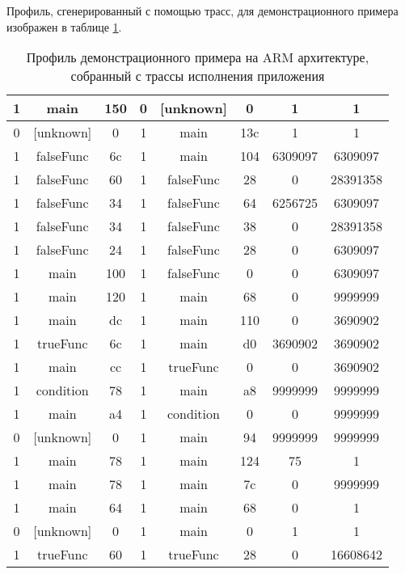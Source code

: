Профиль, сгенерированный с помощью трасс, для демонстрационного примера изображен в таблице \cref{tab:ARMTrace}.
\begin{table} [h]%
    \centering
    \begin{threeparttable}%
        \caption{Профиль демонстрационного примера на ARM архитектуре, собранный с трассы исполнения приложения}%
        \label{tab:ARMTrace}%
        \begin{SingleSpace}
            \begin{tabular}{| c | c | c | c | c | c | c | c |}
                \hline
				1& main& 150& 0& [unknown]& 0& 1& 1 \\ \hline
				0& [unknown]& 0& 1& main& 13c& 1& 1 \\ \hline
				1& falseFunc& 6c& 1& main& 104& 6309097& 6309097 \\ \hline
				1& falseFunc& 60& 1& falseFunc& 28& 0& 28391358 \\ \hline
				1& falseFunc& 34& 1& falseFunc& 64& 6256725& 6309097 \\ \hline
				1& falseFunc& 34& 1& falseFunc& 38& 0& 28391358 \\ \hline
				1& falseFunc& 24& 1& falseFunc& 28& 0& 6309097 \\ \hline
				1& main& 100& 1& falseFunc& 0& 0& 6309097 \\ \hline
				1& main& 120& 1& main& 68& 0& 9999999 \\ \hline
				1& main& dc& 1& main& 110& 0& 3690902 \\ \hline
				1& trueFunc& 6c& 1& main& d0& 3690902& 3690902 \\ \hline
				1& main& cc& 1& trueFunc& 0& 0& 3690902 \\ \hline
				1& condition& 78& 1& main& a8& 9999999& 9999999 \\ \hline
				1& main& a4& 1& condition& 0& 0& 9999999 \\ \hline
				0& [unknown]& 0& 1& main& 94& 9999999& 9999999 \\ \hline
				1& main& 78& 1& main& 124& 75& 1 \\ \hline
				1& main& 78& 1& main& 7c& 0& 9999999 \\ \hline
				1& main& 64& 1& main& 68& 0& 1 \\ \hline
				0& [unknown]& 0& 1& main& 0& 1& 1 \\ \hline
				1& trueFunc& 60& 1& trueFunc& 28& 0& 16608642 \\ \hline

\end{tabular}
\end{SingleSpace}
\end{threeparttable}
\end{table}

